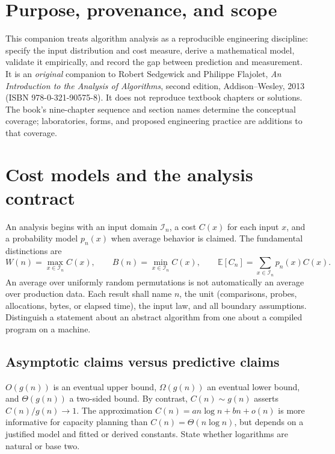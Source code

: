 \documentclass[11pt]{article}
\providecommand{\Expect}{\mathbb{E}}
\begin{document}
\makedoctocpage

\section{Purpose, provenance, and scope}
This companion treats algorithm analysis as a reproducible engineering discipline: specify the input distribution and cost measure, derive a mathematical model, validate it empirically, and record the gap between prediction and measurement. It is an \emph{original} companion to Robert Sedgewick and Philippe Flajolet, \emph{An Introduction to the Analysis of Algorithms}, second edition, Addison--Wesley, 2013 (ISBN 978-0-321-90575-8). It does not reproduce textbook chapters or solutions. The book's nine-chapter sequence and section names determine the conceptual coverage; laboratories, forms, and proposed engineering practice are additions to that coverage.

\section{Cost models and the analysis contract}
An analysis begins with an input domain $\mathcal{I}_n$, a cost $C(x)$ for each input $x$, and a probability model $p_n(x)$ when average behavior is claimed. The fundamental distinctions are
\[
W(n)=\max_{x\in\mathcal{I}_n} C(x),\qquad
B(n)=\min_{x\in\mathcal{I}_n} C(x),\qquad
\Expect[C_n]=\sum_{x\in\mathcal{I}_n}p_n(x)C(x).
\]
An average over uniformly random permutations is not automatically an average over production data. Each result shall name $n$, the unit (comparisons, probes, allocations, bytes, or elapsed time), the input law, and all boundary assumptions. Distinguish a statement about an abstract algorithm from one about a compiled program on a machine.

\subsection{Asymptotic claims versus predictive claims}
$O(g(n))$ is an eventual upper bound, $\Omega(g(n))$ an eventual lower bound, and $\Theta(g(n))$ a two-sided bound. By contrast, $C(n)\sim g(n)$ asserts $C(n)/g(n)\to1$. The approximation $C(n)=an\log n+bn+o(n)$ is more informative for capacity planning than $C(n)=\Theta(n\log n)$, but depends on a justified model and fitted or derived constants. State whether logarithms are natural or base two.
\end{document}
